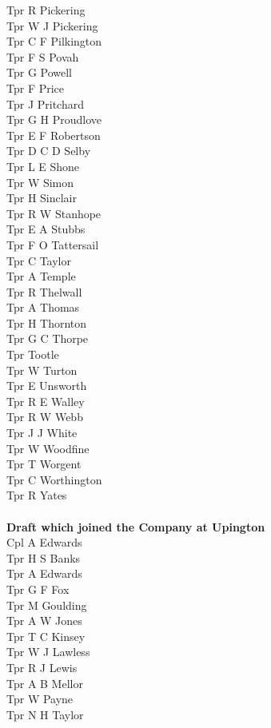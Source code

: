 \begin{multicols}{2}
  Tpr R Pickering \\
  Tpr W J Pickering \\
  Tpr C F Pilkington \\
  Tpr F S Povah \\
  Tpr G Powell \\
  Tpr F Price \\
  Tpr J Pritchard \\
  Tpr G H Proudlove \\
  Tpr E F Robertson \\
  Tpr D C D Selby \\
  Tpr L E Shone \\
  Tpr W Simon \\
  Tpr H Sinclair \\
  Tpr R W Stanhope \\
  Tpr E A Stubbs \\
  Tpr F O Tattersail \\
  Tpr C Taylor \\
  Tpr A Temple \\
  Tpr R Thelwall \\
  Tpr A Thomas \\
  Tpr H Thornton \\
  Tpr G C Thorpe \\
  Tpr Tootle \\
  Tpr W Turton \\
  Tpr E Unsworth \\
  Tpr R E Walley \\
  Tpr R W Webb \\
  Tpr J J White \\
  Tpr W Woodfine \\
  Tpr T Worgent \\
  Tpr C Worthington \\
  Tpr R Yates \\
  \\
  \textbf{Draft which joined the Company at Upington} \\
  Cpl A Edwards \\
  Tpr H S Banks \\
  Tpr A Edwards \\
  Tpr G F Fox \\
  Tpr M Goulding \\
  Tpr A W Jones \\
  Tpr T C Kinsey \\
  Tpr W J Lawless \\
  Tpr R J Lewis \\
  Tpr A B Mellor \\
  Tpr W Payne \\
  Tpr N H Taylor \\
\end{multicols}

